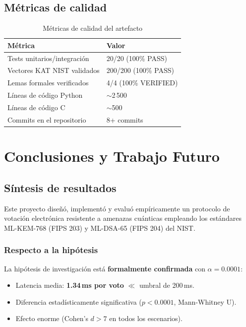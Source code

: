 \documentclass[12pt,a4paper,twoside,openright]{book}
\theoremstyle{plain}
\theoremstyle{definition}
\theoremstyle{remark}
\begin{document}
\section{M\'etricas de calidad}

\begin{table}[H]
\centering
\caption{M\'etricas de calidad del artefacto}
\label{tab:calidad}
\begin{tabular}{ll}
\toprule
\textbf{M\'etrica} & \textbf{Valor} \\
\midrule
Tests unitarios/integraci\'on & 20/20 (100\% PASS) \\
Vectores KAT NIST validados & 200/200 (100\% PASS) \\
Lemas formales verificados & 4/4 (100\% VERIFIED) \\
L\'ineas de c\'odigo Python & $\sim$2\,500 \\
L\'ineas de c\'odigo C & $\sim$500 \\
Commits en el repositorio & 8+ commits \\
\bottomrule
\end{tabular}
\end{table}

\chapter{Conclusiones y Trabajo Futuro}
\label{chap:conclusiones}

\section{S\'intesis de resultados}

Este proyecto dise\~n\'o, implement\'o y evalu\'o emp\'iricamente un protocolo
de votaci\'on electr\'onica resistente a amenazas cu\'anticas empleando los
est\'andares ML-KEM-768 (FIPS 203) y ML-DSA-65 (FIPS 204) del NIST.

\subsection{Respecto a la hip\'otesis}

La hip\'otesis de investigaci\'on est\'a \textbf{formalmente confirmada} con
$\alpha = 0.0001$:
\begin{itemize}
  \item Latencia media: \textbf{1.34\,ms por voto} $\ll$ umbral de 200\,ms.
  \item Diferencia estad\'isticamente significativa ($p < 0.0001$, Mann-Whitney U).
  \item Efecto enorme (Cohen's $d > 7$ en todos los escenarios).
\end{itemize}
\end{document}
